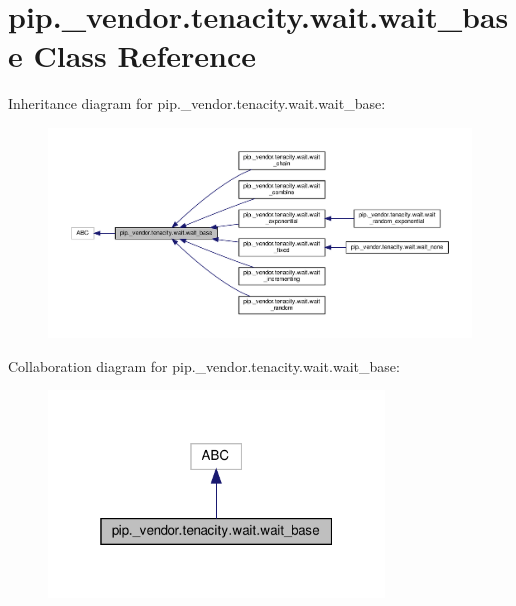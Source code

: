 \hypertarget{classpip_1_1__vendor_1_1tenacity_1_1wait_1_1wait__base}{}\section{pip.\+\_\+vendor.\+tenacity.\+wait.\+wait\+\_\+base Class Reference}
\label{classpip_1_1__vendor_1_1tenacity_1_1wait_1_1wait__base}


Inheritance diagram for pip.\+\_\+vendor.\+tenacity.\+wait.\+wait\+\_\+base\+:
\nopagebreak
\begin{figure}[H]
\begin{center}
\leavevmode
\includegraphics[width=350pt]{classpip_1_1__vendor_1_1tenacity_1_1wait_1_1wait__base__inherit__graph}
\end{center}
\end{figure}


Collaboration diagram for pip.\+\_\+vendor.\+tenacity.\+wait.\+wait\+\_\+base\+:
\nopagebreak
\begin{figure}[H]
\begin{center}
\leavevmode
\includegraphics[width=253pt]{classpip_1_1__vendor_1_1tenacity_1_1wait_1_1wait__base__coll__graph}
\end{center}
\end{figure}
